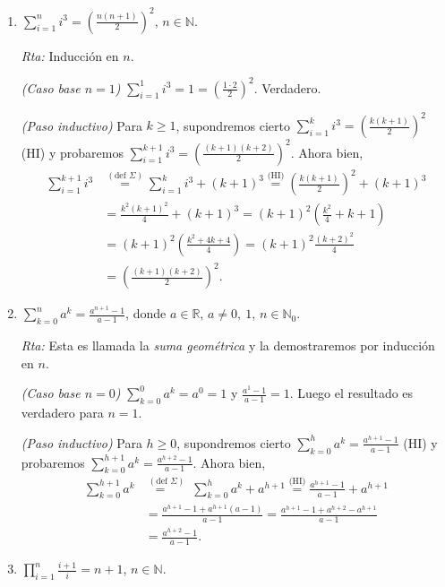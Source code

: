 \documentclass[12pt,spanish,makeidx]{amsbook}
\newcommand{\rta}{\noindent\textit{Rta: }}
\begin{document}
\begin{enumerate}
\begin{enumerate}
			\item  $\displaystyle{ \sum_{i=1}^n i^3 = \left( \frac{n(n+1)}{2 }\right)^2}$, $n\in \mathbb N$.
			
			\rta Inducción en $n$.
			
			\textit{(Caso base $n=1$) } $\sum_{i=1}^1 i^3 = 1 = (\frac{1 \cdot 2}{2})^2$. Verdadero. 
			
			\textit{(Paso inductivo) } Para  $k \ge 1$,  supondremos cierto $\sum_{i=1}^k i^3 = \left( \frac{k(k+1)}{2 }\right)^2$ (HI) y probaremos $\sum_{i=1}^{k+1} i^3 = \left( \frac{(k+1)(k+2)}{2 }\right)^2$. Ahora bien,
			\begin{align*}
				\sum_{i=1}^{k+1} i^3 &\overset{(\text{def } \Sigma)}{=} \sum_{i=1}^k i^3 + (k+1)^3 \overset{\text{(HI)}}{=}  \left( \frac{k(k+1)}{2 }\right)^2 + (k+1)^3 \\
				&= \frac{k^2(k+1)^2}{4 } + (k+1)^3 = (k+1)^2 \left(\frac{k^2}{4 } + k+1 \right)\\
				&= (k+1)^2 \left(\frac{k^2+4k +4}{4 } \right) = (k+1)^2\frac{(k+2)^2}{4 } \\
				&= \left( \frac{(k+1)(k+2)}{2 }\right)^2.
			\end{align*}
			
			\item\label{ej-serie-geometrica}  $\displaystyle{ \sum_{k=0}^n a^k = \frac{a^{n+1}-1}{a-1}}$, donde $a\in {\mathbb R}$, $a \neq 0,\ 1$, $n\in \mathbb N_0$.
			
			\rta Esta es llamada la \textit{suma geométrica} y la demostraremos por inducción en $n$.
			
			\textit{(Caso base $n=0$) } $\sum_{k=0}^0 a^k = a^0 = 1$ y $\frac{a^{1}-1}{a-1}=1$. Luego el resultado es verdadero para  $n=1$. 
			
			\textit{(Paso inductivo) }  Para  $h \ge 0$,  supondremos cierto $\sum_{k=0}^h a^k = \frac{a^{h+1}-1}{a-1}$ (HI) y probaremos $\sum_{k=0}^{h+1} a^k = \frac{a^{h+2}-1}{a-1}$. Ahora bien, 
			\begin{align*}
				\sum_{k=0}^{h+1} a^k &\overset{(\text{def } \Sigma)}{=\quad} \;\sum_{k=0}^h a^k + a^{h+1} \overset{\text{(HI)}}{=} \frac{a^{h+1}-1}{a-1} +  a^{h+1} \\
				&= \frac{a^{h+1}-1 + a^{h+1}(a-1)}{a-1} = \frac{a^{h+1}-1 + a^{h+2}-a^{h+1}}{a-1} \\
				&=\frac{a^{h+2}-1}{a-1}.
			\end{align*}
			
			\item  $\displaystyle{ \prod_{i=1}^n \frac{i+1}{i} = n+1}$, $n\in \mathbb N$.
			

\end{enumerate}
\end{enumerate}
\end{document}
